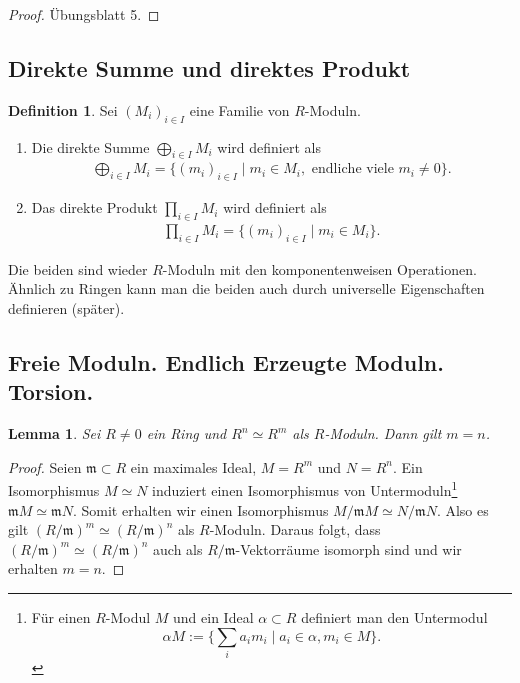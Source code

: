 \documentclass[reqno,12pt]{article}
\numberwithin{equation}{section}
\newcommand{\iso}{\simeq}
\theoremstyle{plain}
\newtheorem{lemma}[thm]{Lemma}
\theoremstyle{definition}
\newtheorem{definition}[thm]{Definition}
\begin{document}
\begin{proof}
Übungsblatt 5.
\end{proof}







\subsection{Direkte Summe und direktes Produkt}

\begin{definition}
Sei $(M_i)_{i \in I}$ eine Familie von $R$-Moduln.
\begin{enumerate}
  \item Die {\sf direkte Summe} $\bigoplus_{i \in I} M_i$ wird definiert als
  \begin{align*}
  \bigoplus_{i \in I} M_i = \big \{ (m_i)_{i \in I} \mid m_i \in M_i, \text{ endliche viele $m_i \neq 0$} \big \}.
  \end{align*}

  \item Das {\sf direkte Produkt} $\prod_{i \in I} M_i$ wird definiert als
  \begin{align*}
  \prod_{i \in I} M_i = \big \{ (m_i)_{i \in I} \mid m_i \in M_i \big \}.
  \end{align*}
\end{enumerate}
Die beiden sind wieder $R$-Moduln mit den komponentenweisen Operationen. Ähnlich zu Ringen kann man die beiden auch durch universelle Eigenschaften definieren (später).
\end{definition}



\subsection{Freie Moduln. Endlich Erzeugte Moduln. Torsion.}



\begin{lemma}
  Sei $R \neq 0$ ein Ring und $R^n \iso R^m$ als $R$-Moduln. Dann gilt $m=n$.
\end{lemma}

\begin{proof}
  Seien $\mathfrak{m} \subset R$ ein maximales Ideal, $M=R^m$ und $N=R^n$. Ein Isomorphismus $M \iso N$ induziert einen Isomorphismus von Untermoduln\footnote{Für einen $R$-Modul $M$ und ein Ideal $\alpha \subset R$ definiert man den Untermodul $$\alpha M := \{ \sum_i a_im_i \mid  a_i \in \alpha, m_i \in M\}.$$} $\mathfrak{m} M \iso \mathfrak{m} N$. Somit erhalten wir einen Isomorphismus $M/ \mathfrak{m} M \iso N/ \mathfrak{m} N$. Also es gilt $(R/\mathfrak{m})^m \iso (R/\mathfrak{m})^n$ als $R$-Moduln. Daraus folgt, dass $(R / \mathfrak{m})^m \iso (R/ \mathfrak{m})^n$ auch als $R / \mathfrak{m}$-Vektorräume isomorph sind und wir erhalten $m=n$.
\end{proof}
\end{document}
